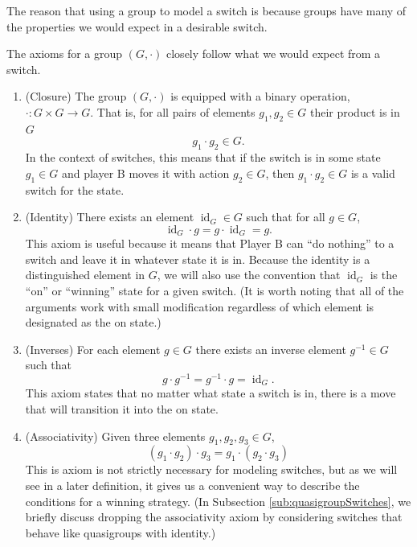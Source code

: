 The reason that using a group to model a switch is because groups have many
of the properties we would expect in a desirable switch.
\begin{note}
  The axioms for a group $(G, \cdot)$ closely follow what we would expect from
  a switch.
\end{note}
 \begin{enumerate}
  \item (Closure) The group $(G, \cdot)$ is equipped with a binary operation,
  $\cdot \colon G \times G \rightarrow G$. That is, for all pairs of elements
   $g_1, g_2 \in G$ their product is in $G$ \[
     g_1 \cdot g_2 \in G.
  \]
  In the context of switches, this
  means that if the switch is in some state $g_1 \in G$ and player B moves
  it with action $g_2 \in G$, then $g_1 \cdot g_2 \in G$ is a valid switch for
  the state.
  \item (Identity) There exists an element $\operatorname{id}_G \in G$ such that
  for all $g \in G$, \[
    \operatorname{id}_G \cdot g = g \cdot \operatorname{id}_G = g.
  \]
  This axiom is useful because it means that Player B can ``do nothing''
  to a switch and leave it in whatever state it is in.
  Because the identity is a distinguished element in $G$,
  we will also use the convention that
  $\operatorname{id}_G$ is the ``on'' or ``winning'' state for a given switch.
  (It is worth noting that all of the arguments work with small modification
  regardless of which element is designated as the on state.)
  \item (Inverses) For each element $g \in G$ there exists an inverse element
  $g^{-1} \in G$ such that \[
    g \cdot g^{-1} = g^{-1} \cdot g = \operatorname{id}_G.
  \]
  This axiom states that no matter what state a switch is in,
  there is a move that will transition it into the on state.
  \item (Associativity) Given three elements $g_1, g_2, g_3 \in G$,
  \[
    (g_1 \cdot g_2) \cdot g_3 = g_1 \cdot (g_2 \cdot g_3)
  \]
  This is axiom is not strictly necessary for modeling switches,
  but as we will see in a later definition, it gives us a convenient way to
  describe the conditions for a winning strategy.
  (In Subsection \ref{sub:quasigroupSwitches}, we briefly discuss dropping
  the associativity axiom by considering switches that behave like
  quasigroups with identity.)
\end{enumerate}


